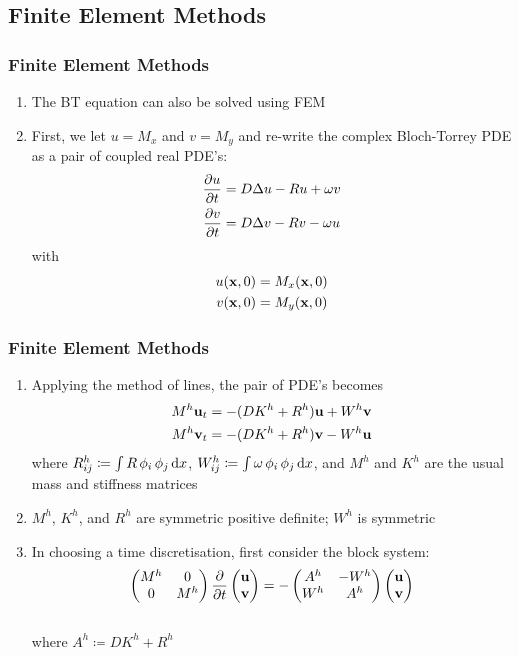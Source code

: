 \subsection{Finite Element Methods}

\begin{frame}
\frametitle{Finite Element Methods}
\begin{enumerate}
    \item The BT equation can also be solved using FEM
    \item First, we let $u=M_x$ and $v=M_y$ and re-write the complex Bloch-Torrey PDE as a pair of coupled real PDE's:
    \begin{align*}
        \frac{\partial u}{\partial t} &= D \mbox{$\Delta$}{u} - R u + \omega v \\
        \frac{\partial v}{\partial t} &= D \mbox{$\Delta$}{v} - R v - \omega u
    \end{align*}
    with
    \begin{align*}
        u(\mathbf{x},0) &= M_x(\mathbf{x},0) \\
        v(\mathbf{x},0) &= M_y(\mathbf{x},0)
    \end{align*}
\end{enumerate}
\end{frame}

\begin{frame}
\frametitle{Finite Element Methods}
\begin{enumerate}
    \item Applying the method of lines, the pair of PDE's becomes
    \begin{align*}
        M^h \mathbf{u}_t &= -(D K^h + R^h) \mathbf{u} + W^h \mathbf{v} \\
        M^h \mathbf{v}_t &= -(D K^h + R^h) \mathbf{v} - W^h \mathbf{u}
    \end{align*}
    where $R^h_{ij} \coloneqq \int R \,\phi_i \,\phi_j \operatorname{d}\!{x}$, $W^h_{ij} \coloneqq \int \omega \,\phi_i \,\phi_j \operatorname{d}\!{x}$, and $M^h$ and $K^h$ are the usual mass and stiffness matrices
    \item $M^h$, $K^h$, and $R^h$ are symmetric positive definite; $W^h$ is symmetric
    \item In choosing a time discretisation, first consider the block system:
    \begin{align*}
    \begin{pmatrix}
    M^h & 0 \\ 
    0 & M^h
    \end{pmatrix}
    \frac{\partial }{\partial t}
    \begin{pmatrix} \mathbf{u} \\ \mathbf{v} \end{pmatrix}
    = -
    \begin{pmatrix}
    A^h & -W^h \\ 
    W^h & A^h
    \end{pmatrix}
    \begin{pmatrix} \mathbf{u} \\ \mathbf{v} \end{pmatrix}
    \end{align*}
    \\ where $A^h \coloneqq D K^h + R^h$
\end{enumerate}
\end{frame}

